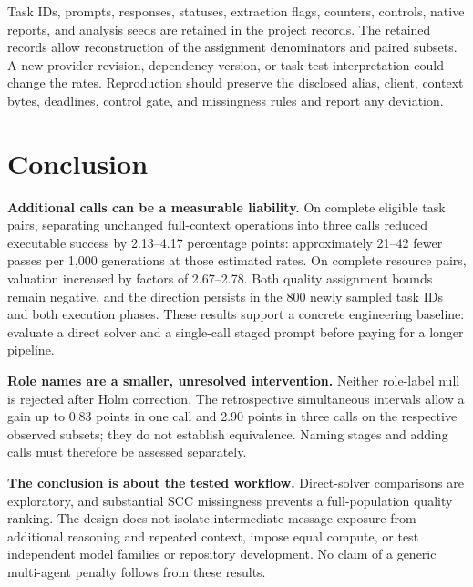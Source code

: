 Task IDs, prompts, responses, statuses, extraction flags, counters, controls, native reports, and analysis seeds are retained in the project records. The retained records allow reconstruction of the assignment denominators and paired subsets. A new provider revision, dependency version, or task-test interpretation could change the rates. Reproduction should preserve the disclosed alias, client, context bytes, deadlines, control gate, and missingness rules and report any deviation.

\section{Conclusion}
\aieditnote
\textbf{Additional calls can be a measurable liability.} On complete eligible task pairs, separating unchanged full-context operations into three calls reduced executable success by 2.13--4.17 percentage points: approximately 21--42 fewer passes per 1,000 generations at those estimated rates. On complete resource pairs, valuation increased by factors of 2.67--2.78. Both quality assignment bounds remain negative, and the direction persists in the 800 newly sampled task IDs and both execution phases. These results support a concrete engineering baseline: evaluate a direct solver and a single-call staged prompt before paying for a longer pipeline.

\textbf{Role names are a smaller, unresolved intervention.} Neither role-label null is rejected after Holm correction. The retrospective simultaneous intervals allow a gain up to 0.83 points in one call and 2.90 points in three calls on the respective observed subsets; they do not establish equivalence. Naming stages and adding calls must therefore be assessed separately.

\textbf{The conclusion is about the tested workflow.} Direct-solver comparisons are exploratory, and substantial SCC missingness prevents a full-population quality ranking. The design does not isolate intermediate-message exposure from additional reasoning and repeated context, impose equal compute, or test independent model families or repository development. No claim of a generic multi-agent penalty follows from these results.

